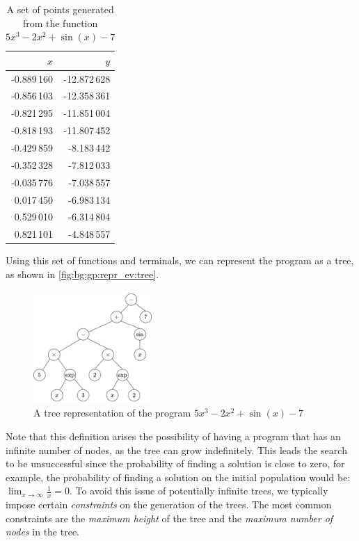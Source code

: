   \begin{table}[ht!]
    \centering
    \begin{tabular}{|r|r|}
      \hline
      \(x\) & \(y\) \\
      \hline
      \hline
      -0.889\,160    & -12.872\,628 \\
      \hline
      -0.856\,103   & -12.358\,361 \\
      \hline
      -0.821\,295   & -11.851\,004 \\
      \hline
      -0.818\,193   & -11.807\,452 \\
      \hline
      -0.429\,859   & -8.183\,442  \\
      \hline
      -0.352\,328   & -7.812\,033  \\
      \hline
      -0.035\,776   & -7.038\,557  \\
      \hline
      0.017\,450  & -6.983\,134  \\
      \hline
      0.529\,010    & -6.314\,804 \\
      \hline
      0.821\,101    & -4.848\,557  \\
      \hline
    \end{tabular}
    \caption{
      A set of points generated from the function \(5x^3 - 2x^2 + \sin(x) - 7\)
    }
    \label{tab:bg:gp:repr_ev:points}
  \end{table}

  Using this set of functions and terminals, we can represent the program as a
  tree, as shown in \vref{fig:bg:gp:repr_ev:tree}.

  \begin{figure}[ht!]
    \centering
    \includegraphics[width=0.4\textwidth]{img/theoretical_framework/Expected Expression Tree.png}
    \caption{
      A tree representation of the program \(5x^3 - 2x^2 + \sin(x) - 7\)
    }
    \label{fig:bg:gp:repr_ev:tree}
  \end{figure}

  Note that this definition arises the possibility of having a program that
  has an infinite number of nodes, as the tree can grow indefinitely.
  This leads the search to be unsuccessful since the probability of finding a
  solution is close to zero, for example, the probability of finding a solution
  on the initial population would be: \(\lim_{x \to \infty} \frac{1}{x} = 0\).
  To avoid this issue of potentially infinite trees, we typically impose certain
  \emph{constraints} on the generation of the trees.
  The most common constraints are the \emph{maximum height} of the tree and the
  \emph{maximum number of nodes} in the tree.
